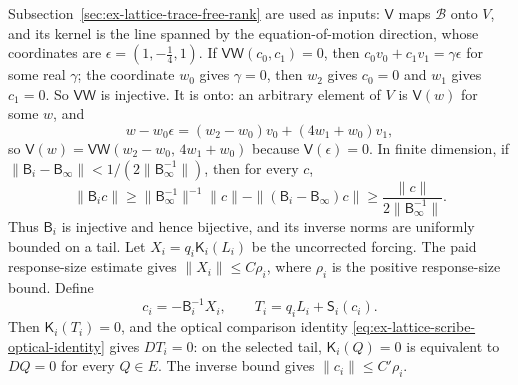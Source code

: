 Subsection~\ref{sec:ex-lattice-trace-free-rank} are used as inputs:
$\mathsf V$ maps $\mathcal B$ onto $V$, and its kernel is the line
spanned by the equation-of-motion direction, whose coordinates are
$\epsilon=(1,-\tfrac14,1)$. If $\mathsf V\mathsf W(c_0,c_1)=0$, then
$c_0v_0+c_1v_1=\gamma\epsilon$ for some real $\gamma$; the coordinate
$w_0$ gives $\gamma=0$, then $w_2$ gives $c_0=0$ and $w_1$ gives
$c_1=0$. So $\mathsf V\mathsf W$ is injective. It is onto: an arbitrary
element of $V$ is $\mathsf V(w)$ for some $w$, and
\[
 w-w_0\epsilon=(w_2-w_0)v_0+(4w_1+w_0)v_1,
\]
so $\mathsf V(w)=\mathsf V\mathsf W(w_2-w_0,\,4w_1+w_0)$ because
$\mathsf V(\epsilon)=0$. In finite dimension, if
$\|\mathsf B_i-\mathsf B_\infty\|<1/(2\|\mathsf B_\infty^{-1}\|)$,
then for every $c$,
\[
 \|\mathsf B_i c\|\ge
 \|\mathsf B_\infty^{-1}\|^{-1}\|c\|-\|
   (\mathsf B_i-\mathsf B_\infty)c\|
 \ge \frac{\|c\|}{2\|\mathsf B_\infty^{-1}\|}.
\]
Thus $\mathsf B_i$ is injective and hence bijective, and its inverse norms
are uniformly bounded on a tail. Let $X_i=q_i\mathsf K_i(L_i)$ be the
uncorrected forcing. The paid response-size estimate gives
$\|X_i\|\le C\rho_i$, where $\rho_i$ is the positive response-size
bound. Define
\[
 c_i=-\mathsf B_i^{-1}X_i,\qquad
 T_i=q_iL_i+\mathsf S_i(c_i).
\]
Then $\mathsf K_i(T_i)=0$, and the optical comparison identity
\eqref{eq:ex-lattice-scribe-optical-identity} gives
$DT_i=0$: on the selected tail, $\mathsf K_i(Q)=0$ is equivalent to
$DQ=0$ for every $Q\in E$. The inverse bound gives
$\|c_i\|\le C'\rho_i$.

